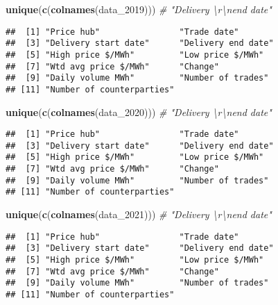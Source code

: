 \documentclass[
]{article}
\newenvironment{Shaded}{\begin{snugshade}}{\end{snugshade}}
\newcommand{\CommentTok}[1]{\textcolor[rgb]{0.56,0.35,0.01}{\textit{#1}}}
\newcommand{\FunctionTok}[1]{\textcolor[rgb]{0.13,0.29,0.53}{\textbf{#1}}}
\newcommand{\NormalTok}[1]{#1}
\begin{document}
\begin{Shaded}
\begin{Highlighting}[]
\FunctionTok{unique}\NormalTok{(}\FunctionTok{c}\NormalTok{(}\FunctionTok{colnames}\NormalTok{(data\_2019))) }\CommentTok{\# "Delivery \textbackslash{}r\textbackslash{}nend date"}
\end{Highlighting}
\end{Shaded}

\begin{verbatim}
##  [1] "Price hub"                "Trade date"              
##  [3] "Delivery start date"      "Delivery end date"       
##  [5] "High price $/MWh"         "Low price $/MWh"         
##  [7] "Wtd avg price $/MWh"      "Change"                  
##  [9] "Daily volume MWh"         "Number of trades"        
## [11] "Number of counterparties"
\end{verbatim}

\begin{Shaded}
\begin{Highlighting}[]
\FunctionTok{unique}\NormalTok{(}\FunctionTok{c}\NormalTok{(}\FunctionTok{colnames}\NormalTok{(data\_2020))) }\CommentTok{\# "Delivery \textbackslash{}r\textbackslash{}nend date"}
\end{Highlighting}
\end{Shaded}

\begin{verbatim}
##  [1] "Price hub"                "Trade date"              
##  [3] "Delivery start date"      "Delivery end date"       
##  [5] "High price $/MWh"         "Low price $/MWh"         
##  [7] "Wtd avg price $/MWh"      "Change"                  
##  [9] "Daily volume MWh"         "Number of trades"        
## [11] "Number of counterparties"
\end{verbatim}

\begin{Shaded}
\begin{Highlighting}[]
\FunctionTok{unique}\NormalTok{(}\FunctionTok{c}\NormalTok{(}\FunctionTok{colnames}\NormalTok{(data\_2021))) }\CommentTok{\# "Delivery \textbackslash{}r\textbackslash{}nend date"}
\end{Highlighting}
\end{Shaded}

\begin{verbatim}
##  [1] "Price hub"                "Trade date"              
##  [3] "Delivery start date"      "Delivery end date"       
##  [5] "High price $/MWh"         "Low price $/MWh"         
##  [7] "Wtd avg price $/MWh"      "Change"                  
##  [9] "Daily volume MWh"         "Number of trades"        
## [11] "Number of counterparties"
\end{verbatim}
\end{document}

